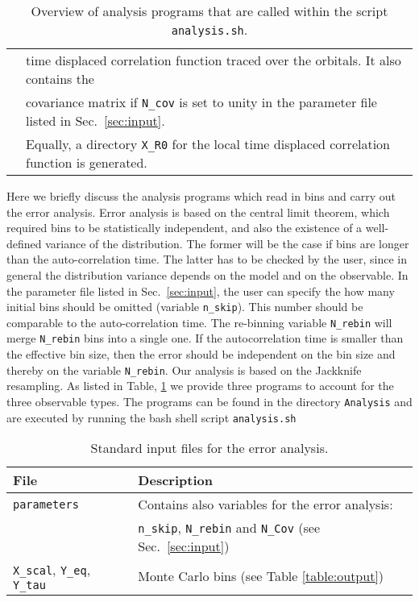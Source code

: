 \begin{table}[h]
\begin{tabular}{@{} l l @{}}
                           & time displaced correlation function traced over the  orbitals.  It also contains the  \\
                           & covariance matrix if \texttt{N\_cov} is set to unity in the parameter file  listed in Sec.~\ref{sec:input}. \\
                           & Equally, a directory  \texttt{X\_R0}  for the local  time displaced  correlation function is generated. \\\bottomrule
   \end{tabular}
   \caption{ Overview of analysis programs that are called within the script \texttt{analysis.sh}. \label{table:analysis_programs}}
\end{table}
%
Here we briefly discuss the analysis programs which read in bins and carry out the error analysis.  
Error analysis   is based  on the central limit theorem,  which required bins to be statistically independent, and also the existence of a well-defined variance of the distribution. 
The former will be the case if bins are  longer than the auto-correlation time.  The latter has to be checked by the user, since in general the distribution variance depends on the model and on the observable. 
In the parameter file listed in Sec.~\ref{sec:input}, the user  can specify the how many initial bins should be omitted (variable \texttt{n\_skip}). 
This  number should be comparable to the auto-correlation time.     
The  re-binning  variable \texttt{N\_rebin} will merge \texttt{N\_rebin}  bins into a single one.  If the autocorrelation time  is smaller than the effective bin size, then the error should be independent on the bin size and thereby on the variable \texttt{N\_rebin}.  Our analysis is based on the Jackknife resampling.  As listed in Table,  \ref{table:analysis_programs}  we provide three programs to account for the three observable types. The programs can be found in the directory \texttt{Analysis}  and   are executed by running the  bash shell script 
\texttt{analysis.sh}
%
\begin{table}[h]
   \begin{tabular}{@{} l l @{}}\toprule
   File & Description \\\midrule
   \texttt{parameters}  &  Contains also variables for the error analysis:\\
   & \texttt{n\_skip}, \texttt{N\_rebin} and \texttt{N\_Cov} (see Sec.~\ref{sec:input}) \\
   \texttt{X\_scal}, \texttt{Y\_eq}, \texttt{Y\_tau} & Monte Carlo bins (see Table \ref{table:output}) \\\bottomrule
    \end{tabular}
   \caption{Standard input files for the error analysis. \label{table:analysis_input}}
\end{table}
